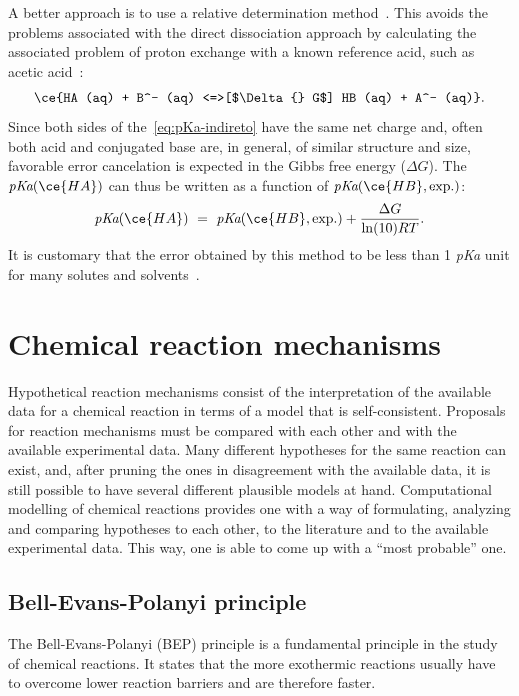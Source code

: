 A better approach is to use a relative determination method~\cite{Ding_2009}.
This avoids the problems associated with the direct dissociation approach
by calculating the associated problem of proton exchange with a known reference
acid,
such as acetic acid~\cite{Goldberg_2002}:
%
\begin{equation}
	\ce{HA (aq) + B^- (aq) <=>[$\Delta{} G$] HB (aq) + A^- (aq)}\text{.}
	\label{eq:pKa-indireto}
\end{equation}
%
Since both sides of the~\cref{eq:pKa-indireto}
have the same net charge and,
often both acid and conjugated base are,
in
general,
of similar structure and size,
favorable error cancelation is expected
in the Gibbs free energy ($\Delta G$).
The $\emph{pKa}(\ce{HA})$
can thus be written as a function of $\emph{pKa}(\ce{HB},
	\text{exp.})$:
%
\begin{equation}
	\emph{pKa}(\ce{HA})~=~\emph{pKa}(\ce{HB},
	\text{exp.}) + \frac{\Delta G}{\ln(10) R T}\text{.}
\end{equation}
%
It is customary that the error obtained by this method to be less than 1 \emph{pKa}
unit for many solutes and solvents~\cite{Ding_2009}.

\section{Chemical reaction mechanisms}

Hypothetical reaction mechanisms consist of
the interpretation of the available data for a chemical reaction
in terms of a model that is self-consistent.
Proposals for reaction mechanisms must be compared
with each other
and with the available experimental data.
Many different hypotheses for the same reaction can exist,
and,
after pruning the ones in disagreement with the available data,
it is still possible to have several different plausible models at hand.
Computational modelling of chemical reactions
provides one with a way of
formulating,
analyzing and
comparing hypotheses to each other,
to the literature and to the available experimental data.
This way,
one is able to come up with a ``most probable'' one.

\subsection{Bell-Evans-Polanyi principle}

The Bell-Evans-Polanyi (BEP) principle is a fundamental principle in the study
of chemical reactions.
It states that the more exothermic reactions usually have to overcome lower
reaction barriers and are therefore faster.

